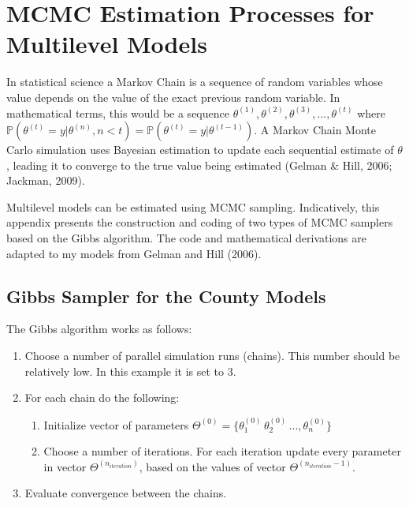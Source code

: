 \documentclass[12pt,twoside]{reedthesis}
\begin{document}
  \appendix
  
  \chapter{MCMC Estimation Processes for Multilevel
  Models}\label{mcmc-estimation-processes-for-multilevel-models}
  
  In statistical science a Markov Chain is a sequence of random variables
  whose value depends on the value of the exact previous random variable.
  In mathematical terms, this would be a sequence
  \(\theta^{(1)}, \theta^{(2)}, \theta^{(3)}, ..., \theta^{(t)}\) where
  \(\mathbb{P}(\theta^{(t)} = y|\theta^{(n)}, n<t) = \mathbb{P}(\theta^{(t)} = y|\theta^{(t-1)})\).
  A Markov Chain Monte Carlo simulation uses Bayesian estimation to update
  each sequential estimate of \(\theta\), leading it to converge to the
  true value being estimated (Gelman \& Hill, 2006; Jackman, 2009).
  
  Multilevel models can be estimated using MCMC sampling. Indicatively,
  this appendix presents the construction and coding of two types of MCMC
  samplers based on the Gibbs algorithm. The code and mathematical
  derivations are adapted to my models from Gelman and Hill (2006).
  
  \section{Gibbs Sampler for the County
  Models}\label{gibbs-sampler-for-the-county-models}
  
  The Gibbs algorithm works as follows:
  
  \begin{enumerate}
    \item Choose a number of parallel simulation runs (chains). This number should be relatively low. In this example it is set to 3.
    \item For each chain do the following:
    \begin{enumerate}
      \item Initialize vector of parameters $\Theta^{(0)} = \{\theta^{(0)}_1\, \theta^{(0)}_2\, ..., \theta^{(0)}_n\}$
      \item Choose a number of iterations. For each iteration update every parameter in vector $\Theta^{(n_{iteration})}$, based on the values of vector $\Theta^{(n_{iteration} - 1)}$.
    \end{enumerate}
    \item Evaluate convergence between the chains.
  \end{enumerate}
  
\end{document}
